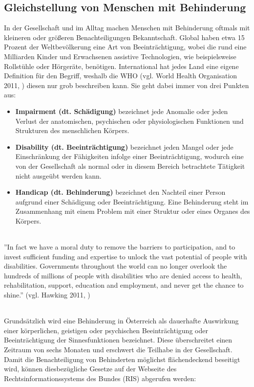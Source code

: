 \subsection{Gleichstellung von Menschen mit Behinderung}
In der Gesellschaft und im Alltag machen Menschen mit Behinderung oftmals mit kleineren oder größeren Benachteiligungen Bekanntschaft. Global haben etwa 15 Prozent der Weltbevölkerung eine Art von Beeinträchtigung, wobei die rund eine Milliarden Kinder und Erwachsenen assistive Technologien, wie beispielsweise Rollstühle oder Hörgeräte, benötigen. International hat jedes Land eine eigene Definition für den Begriff, weshalb die WHO (vgl. World Health Organisation 2011, \cite{who_disability_2011}) diesen nur grob beschreiben kann. Sie geht dabei immer von drei Punkten aus:

\begin{itemize}
    \item \textbf{Impairment (dt. Schädigung)} bezeichnet jede Anomalie oder jeden Verlust der anatomischen, psychischen oder physiologischen Funktionen und Strukturen des menschlichen Körpers.
    \item \textbf{Disability (dt. Beeinträchtigung)} bezeichnet jeden Mangel oder jede Einschränkung der Fähigkeiten infolge einer Beeinträchtigung, wodurch eine von der Gesellschaft als normal oder in diesem Bereich betrachtete Tätigkeit nicht ausgeübt werden kann.
    \item \textbf{Handicap (dt. Behinderung)} bezeichnet den Nachteil einer Person aufgrund einer Schädigung oder Beeinträchtigung. Eine Behinderung steht im Zusammenhang mit einem Problem mit einer Struktur oder eines Organes des Körpers.
\end{itemize}

\mbox{}\\
''In fact we have a moral duty to remove the barriers to participation, and to invest sufficient funding and expertise to unlock the vast potential of people with disabilities. Governments throughout
the world can no longer overlook the hundreds of millions of people with disabilities who are denied
access to health, rehabilitation, support, education and employment, and never get the chance to shine.'' (vgl. Hawking 2011, \cite{hawking_who_disability_2011})

\mbox{}\\Grundsätzlich wird eine Behinderung in Österreich als dauerhafte Auswirkung einer körperlichen, geistigen oder psychischen Beeinträchtigung oder Beeinträchtigung der Sinnesfunktionen bezeichnet. Diese überschreitet einen Zeitraum von sechs Monaten und erschwert die Teilhabe in der Gesellschaft. Damit die Benachteiligung von Behinderten möglichst flächendeckend beseitigt wird, können diesbezügliche Gesetze auf der Webseite des Rechtsinformationssystems des Bundes (RIS) abgerufen werden:

